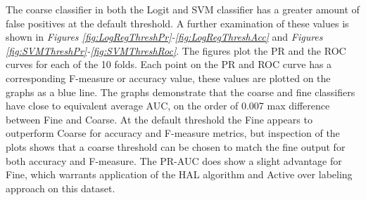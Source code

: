 \documentclass[ms]{nuthesis}
\begin{document}
\par The coarse classifier in both the Logit and SVM classifier has a greater
 amount of false positives at the default threshold. A further examination of these
 values is shown in \textit{Figures \ref{fig:LogRegThreshPr}-\ref{fig:LogRegThreshAcc}}
  and \textit{Figures \ref{fig:SVMThreshPr}-\ref{fig:SVMThreshRoc}}. The figures plot the PR and the ROC
 curves for each of the 10 folds. Each point on the PR and ROC curve has a
 corresponding F-measure or accuracy value, these values are plotted on the graphs
 as a blue line. The graphs demonstrate that the coarse and fine classifiers have close
 to equivalent average AUC, on the order of 0.007 max difference between Fine and Coarse.
  At the default threshold the Fine appears to outperform Coarse for accuracy and F-measure
  metrics, but inspection of the plots shows that a coarse threshold can be chosen to match the fine output for
 both accuracy and F-measure. The PR-AUC does show a slight advantage for Fine,
 which warrants application of the HAL algorithm and Active over labeling approach on this dataset.
\end{document}
